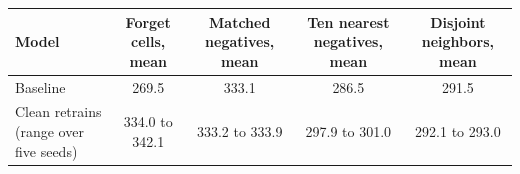 \begin{tabular}{lcccc}
\toprule
Model & Forget cells, mean & Matched negatives, mean & Ten nearest negatives, mean & Disjoint neighbors, mean \\
\midrule
Baseline & 269.5 & 333.1 & 286.5 & 291.5 \\
Clean retrains (range over five seeds) & 334.0 to 342.1 & 333.2 to 333.9 & 297.9 to 301.0 & 292.1 to 293.0 \\
\bottomrule
\end{tabular}
